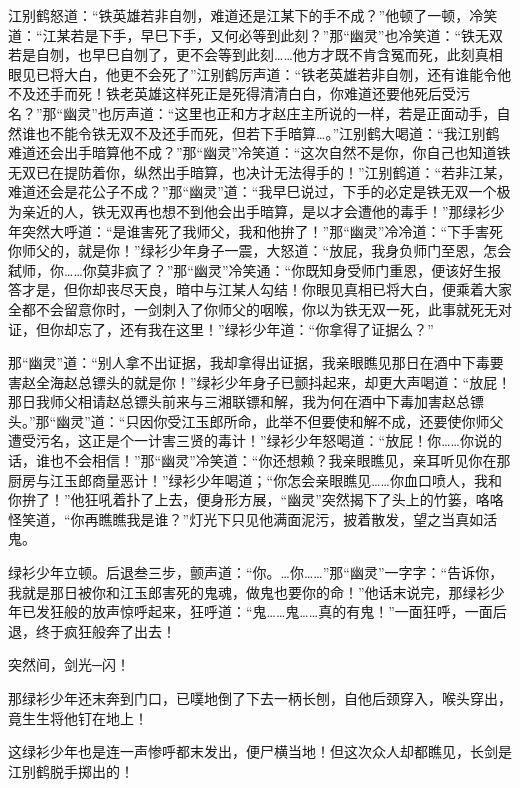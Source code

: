 \documentclass[12pt,oneside]{book}
\begin{document}
江别鹤怒道：``铁英雄若非自刎，难道还是江某下的手不成？''他顿了一顿，冷笑道：``江某若是下手，早巳下手，又何必等到此刻？''那``幽灵''也冷笑道：``铁无双若是自刎，也早巳自刎了，更不会等到此刻\ldots\ldots 他方才既不肯含冤而死，此刻真相眼见已将大白，他更不会死了''江别鹤厉声道：``铁老英雄若非自刎，还有谁能令他不及还手而死！铁老英雄这样死正是死得清清白白，你难道还要他死后受污名？''那``幽灵''也厉声道：``这里也正和方才赵庄主所说的一样，若是正面动手，自然谁也不能令铁无双不及还手而死，但若下手暗算\ldots。''江别鹤大喝道：``我江别鹤难道还会出手暗算他不成？''那``幽灵''冷笑道：``这次自然不是你，你自己也知道铁无双已在提防着你，纵然出手暗算，也决计无法得手的！''江别鹤道：``若非江某，难道还会是花公子不成？''那``幽灵''道：``我早巳说过，下手的必定是铁无双一个极为亲近的人，铁无双再也想不到他会出手暗算，是以才会遭他的毒手！''那绿衫少年突然大呼道：``是谁害死了我师父，我和他拚了！''那``幽灵''冷冷道：``下手害死你师父的，就是你！''绿衫少年身子一震，大怒道：``放屁，我身负师门至恩，怎会弑师，你\ldots\ldots 你莫非疯了？''那``幽灵''冷笑通：``你既知身受师门重恩，便该好生报答才是，但你却丧尽天良，暗中与江某人勾结！你眼见真相已将大白，便乘着大家全都不会留意你时，一剑刺入了你师父的咽喉，你以为铁无双一死，此事就死无对证，但你却忘了，还有我在这里！''绿衫少年道：``你拿得了证据么？''

那``幽灵''道：``别人拿不出证据，我却拿得出证据，我亲眼瞧见那日在酒中下毒要害赵全海赵总镖头的就是你！''绿衫少年身子已颤抖起来，却更大声喝道：``放屁！那日我师父相请赵总镖头前来与三湘联镖和解，我为何在酒中下毒加害赵总镖头。''那``幽灵''道：``只因你受江玉郎所命，此举不但要使和解不成，还要使你师父遭受污名，这正是个一计害三贤的毒计！''绿衫少年怒喝道：``放屁！你\ldots\ldots 你说的话，谁也不会相信！''那``幽灵''冷笑道：``你还想赖？我亲眼瞧见，亲耳听见你在那厨房与江玉郎商量恶计！''绿衫少年喝道；``你怎会亲眼瞧见\ldots\ldots 你血口喷人，我和你拚了！''他狂吼着扑了上去，便身形方展，``幽灵''突然揭下了头上的竹篓，咯咯怪笑道，``你再瞧瞧我是谁？''灯光下只见他满面泥污，披着散发，望之当真如活鬼。

绿衫少年立顿。后退叁三步，颤声道：``你。\ldots 你\ldots\ldots{}''那``幽灵''一字字：``告诉你，我就是那日被你和江玉郎害死的鬼魂，做鬼也要你的命！''他话末说完，那绿衫少年已发狂般的放声惊呼起来，狂呼道：``鬼\ldots\ldots 鬼\ldots\ldots 真的有鬼！''一面狂呼，一面后退，终于疯狂般奔了出去！

突然间，剑光─闪！

那绿衫少年还末奔到门口，已噗地倒了下去一柄长刨，自他后颈穿入，喉头穿出，竟生生将他钉在地上！

这绿衫少年也是连一声惨呼都末发出，便尸横当地！但这次众人却都瞧见，长剑是江别鹤脱手掷出的！
\end{document}
